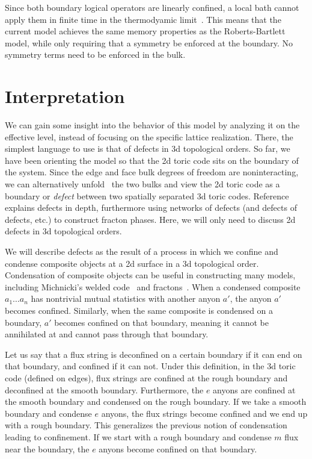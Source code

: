 Since both boundary logical operators are linearly confined, a local bath cannot apply them in finite time in the thermodyamic limit~\cite{RobertsBartlett2020}. This means that the current model achieves the same memory properties as the Roberts-Bartlett model, while only requiring that a symmetry be enforced at the boundary. No symmetry terms need to be enforced in the bulk.

\section{Interpretation} \label{sec:interp}

We can gain some insight into the behavior of this model by analyzing it on the effective level, instead of focusing on the specific lattice realization. There, the simplest language to use is that of defects in 3d topological orders. So far, we have been orienting the model so that the 2d toric code sits on the boundary of the system. Since the edge and face bulk degrees of freedom are noninteracting, we can alternatively unfold~\cite{KitaevKong2012} the two bulks and view the 2d toric code as a boundary or \emph{defect} between two spatially separated 3d toric codes. Reference~\cite{Aasen2020Defect} explains defects in depth, furthermore using networks of defects (and defects of defects, etc.) to construct fracton phases. Here, we will only need to discuss 2d defects in 3d topological orders. 

We will describe defects as the result of a process in which we confine and condense composite objects at a 2d surface in a 3d topological order. Condensation of composite objects can be useful in constructing many models, including Michnicki's welded code~\cite{Michnicki2014PowerLaw, Siva2017Marginally} and fractons~\cite{Ma2017Coupled, Vijay2017Layer, Qi2021Exotic}. When a condensed composite $a_1\dots a_n$ has nontrivial mutual statistics with another anyon $a'$, the anyon $a'$ becomes confined. Similarly, when the same composite is condensed on a boundary, $a'$ becomes confined on that boundary, meaning it cannot be annihilated at and cannot pass through that boundary.

Let us say that a flux string is deconfined on a certain boundary if it can end on that boundary, and confined if it can not. Under this definition, in the 3d toric code (defined on edges), flux strings are confined at the rough boundary and deconfined at the smooth boundary. Furthermore, the $e$ anyons are confined at the smooth boundary and condensed on the rough boundary. If we take a smooth boundary and condense $e$ anyons, the flux strings become confined and we end up with a rough boundary. This generalizes the previous notion of condensation leading to confinement. If we start with a rough boundary and condense $m$ flux near the boundary, the $e$ anyons become confined on that boundary.

